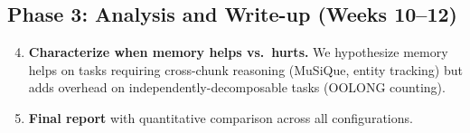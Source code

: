 \documentclass[11pt]{article}
\begin{document}
\subsection{Phase 3: Analysis and Write-up (Weeks 10--12)}

\begin{enumerate}
    \setcounter{enumi}{3}
    \item \textbf{Characterize when memory helps vs.\ hurts.} We hypothesize memory helps on tasks requiring cross-chunk reasoning (MuSiQue, entity tracking) but adds overhead on independently-decomposable tasks (OOLONG counting).

    \item \textbf{Final report} with quantitative comparison across all configurations.
\end{enumerate}
\end{document}
